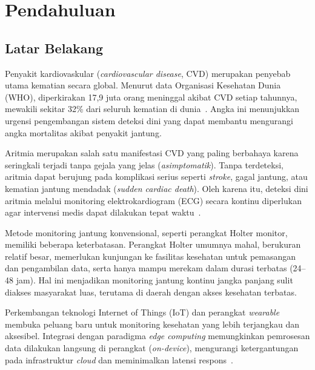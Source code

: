 \chapter{Pendahuluan}

\section{Latar Belakang}

Penyakit kardiovaskular (\textit{cardiovascular disease}, CVD) merupakan penyebab utama kematian secara global. Menurut data Organisasi Kesehatan Dunia (WHO), diperkirakan 17,9 juta orang meninggal akibat CVD setiap tahunnya, mewakili sekitar 32\% dari seluruh kematian di dunia~\cite{who_cvd}. Angka ini menunjukkan urgensi pengembangan sistem deteksi dini yang dapat membantu mengurangi angka mortalitas akibat penyakit jantung.

Aritmia merupakan salah satu manifestasi CVD yang paling berbahaya karena seringkali terjadi tanpa gejala yang jelas (\textit{asimptomatik}). Tanpa terdeteksi, aritmia dapat berujung pada komplikasi serius seperti \textit{stroke}, gagal jantung, atau kematian jantung mendadak (\textit{sudden cardiac death}). Oleh karena itu, deteksi dini aritmia melalui monitoring elektrokardiogram (ECG) secara kontinu diperlukan agar intervensi medis dapat dilakukan tepat waktu~\cite{sheeba_rani_2026}.

Metode monitoring jantung konvensional, seperti perangkat Holter monitor, memiliki beberapa keterbatasan. Perangkat Holter umumnya mahal, berukuran relatif besar, memerlukan kunjungan ke fasilitas kesehatan untuk pemasangan dan pengambilan data, serta hanya mampu merekam dalam durasi terbatas (24--48 jam). Hal ini menjadikan monitoring jantung kontinu jangka panjang sulit diakses masyarakat luas, terutama di daerah dengan akses kesehatan terbatas.

Perkembangan teknologi Internet of Things (IoT) dan perangkat \textit{wearable} membuka peluang baru untuk monitoring kesehatan yang lebih terjangkau dan aksesibel. Integrasi dengan paradigma \textit{edge computing} memungkinkan pemrosesan data dilakukan langsung di perangkat (\textit{on-device}), mengurangi ketergantungan pada infrastruktur \textit{cloud} dan meminimalkan latensi respons~\cite{tinyml_iot_review, yahyati_2025}.

